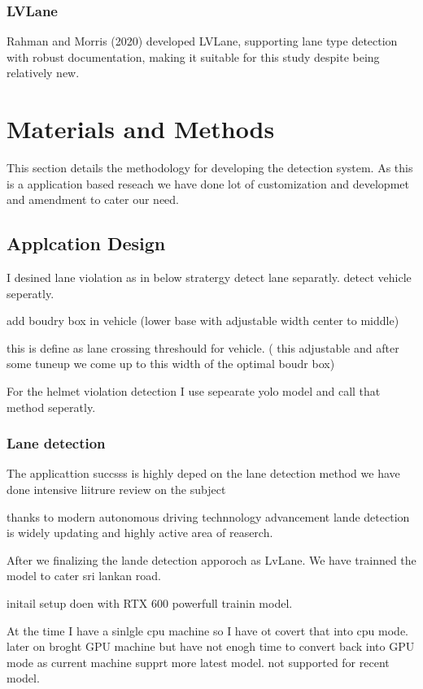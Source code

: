 \documentclass[12pt,a4paper]{article}
\begin{document}
\subsubsection{LVLane}
Rahman and Morris (2020) developed LVLane, supporting lane type detection with robust documentation, making it suitable for this study despite being relatively new.

\section{Materials and Methods}
This section details the methodology for developing the detection system.
As this is a application based reseach we have done lot of customization and developmet and amendment to cater our need.

\subsection{Applcation Design}

I desined lane violation as in below stratergy
detect lane separatly.
detect vehicle seperatly.

add boudry box in vehicle (lower base with adjustable width center to middle)

this is define as lane crossing threshould for vehicle.
( this adjustable and after some tuneup we come up to this width of the optimal boudr box)

For the helmet violation detection I use sepearate yolo model and call that method seperatly.


\subsubsection{Lane detection}

The applicattion succsss is highly deped on the lane detection method we have done intensive liitrure review on the subject

thanks to modern autonomous driving technnology advancement lande detection is widely updating and highly active area of reaserch.



After we finalizing the lande detection apporoch as LvLane.
We have trainned the model to cater sri lankan road.

initail setup doen with RTX 600 powerfull trainin model.

At the time I have a sinlgle cpu machine so  I have ot covert that into cpu mode.
later on broght GPU machine but have not enogh time to convert back into GPU mode as current machine supprt more latest model.
not supported for recent model.
\end{document}
